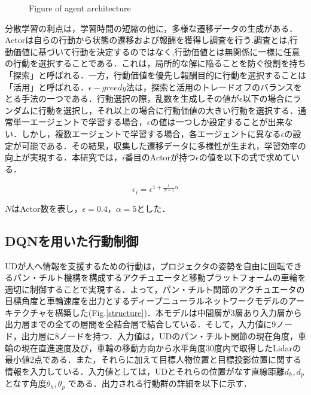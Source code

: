 \documentclass[12pt]{sonota/aislab}
\begin{document}
\begin{figure}[tbp]

	\begin{center}
	\hspace{10mm}
	\end{center}
	
	\caption{Figure of agent architecture}
	\label{fig:twofig_dqn}
\end{figure}


分散学習の利点は，学習時間の短縮の他に，多様な遷移データの生成がある．Actorは自らの行動から状態の遷移および報酬を獲得し調査を行う.調査とは,行動価値に基づいて行動を決定するのではなく,行動価値とは無関係に一様に任意の行動を選択することである．これは，局所的な解に陥ることを防ぐ役割を持ち「探索」と呼ばれる．一方，行動価値を優先し報酬目的に行動を選択することは「活用」と呼ばれる．$\epsilon-greedy$法は，探索と活用のトレードオフのバランスをとる手法の一つである．行動選択の際，乱数を生成しその値が$\epsilon$以下の場合にランダムに行動を選択し，それ以上の場合に行動価値の大きい行動を選択する．通常単一エージェントで学習する場合，$\epsilon$の値は一つしか設定することが出来ない．しかし，複数エージェントで学習する場合，各エージェントに異なる$\epsilon$の設定が可能である．その結果，収集した遷移データに多様性が生まれ，学習効率の向上が実現する．本研究では，$i$番目のActorが持つ$\epsilon$の値を以下の式で求めている．

\begin{equation}
\label{sum_P_i}
  \epsilon_{i}=\epsilon^{1+\frac{i}{N-1}\alpha}
\end{equation}

$N$はActor数を表し，$\epsilon=0.4$，$\alpha=5$とした．

\subsection{DQNを用いた行動制御}
UDが人へ情報を支援するための行動は，プロジェクタの姿勢を自由に回転できるパン・チルト機構を構成するアクチュエータと移動プラットフォームの車輪を適切に制御することで実現する．よって，パン・チルト関節のアクチュエータの目標角度と車輪速度を出力とするディープニューラルネットワークモデルのアーキテクチャを構築した(Fig.\ref{structure})．本モデルは中間層が3層あり入力層から出力層までの全ての層間を全結合層で結合している．そして，入力値に9ノード，出力層に8ノードを持つ．入力値は，UDのパン・チルト関節の現在角度，車輪の現在直進速度及び，車輪の移動方向から水平角度30度内で取得したLidarの最小値2点である．また，それらに加えて目標人物位置と目標投影位置に関する情報を入力している．入力値としては，UDとそれらの位置がなす直線距離$d_{h},d_{p}$となす角度$\theta_{h},\theta_{p}$
である．出力される行動群の詳細を以下に示す．
\end{document}
